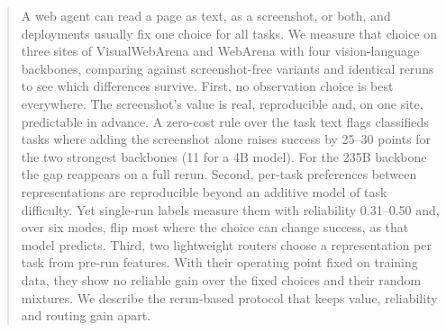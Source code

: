 \begin{abstract}
A web agent can read a page as text, as a screenshot, or both, and deployments usually fix one choice for all tasks. We measure that choice on three sites of VisualWebArena and WebArena with four vision-language backbones, comparing against screenshot-free variants and identical reruns to see which differences survive.
First, no observation choice is best everywhere. The screenshot's value is real, reproducible and, on one site, predictable in advance. A zero-cost rule over the task text flags classifieds tasks where adding the screenshot alone raises success by 25--30 points for the two strongest backbones (11 for a 4B model). For the 235B backbone the gap reappears on a full rerun. Second, per-task preferences between representations are reproducible beyond an additive model of task difficulty. Yet single-run labels measure them with reliability 0.31--0.50 and, over six modes, flip most where the choice can change success, as that model predicts. Third, two lightweight routers choose a representation per task from pre-run features. With their operating point fixed on training data, they show no reliable gain over the fixed choices and their random mixtures. We describe the rerun-based protocol that keeps value, reliability and routing gain apart.
\end{abstract}

